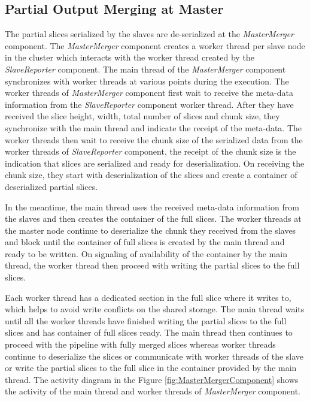 \subsection{Partial Output Merging at Master} \label{MMComp}

The partial slices serialized by the slaves are de-serialized at the \textit{MasterMerger} component. The \textit{MasterMerger} component creates a worker thread per slave node in the cluster which interacts with the worker thread created by the \textit{SlaveReporter} component. The main thread of the \textit{MasterMerger} component synchronizes with worker threads at various points during the execution. The worker threads of \textit{MasterMerger} component first wait to receive the meta-data information from the \textit{SlaveReporter} component worker thread. After they have received the slice height, width, total number of slices and chunk size, they synchronize with the main thread and indicate the receipt of the meta-data. The worker threads then wait to receive the chunk size of the serialized data from the worker threads of \textit{SlaveReporter} component, the receipt of the chunk size is the indication that slices are serialized and ready for deserialization. On receiving the chunk size, they start with deserialization of the slices and create a container of deserialized partial slices. \newline

In the meantime, the main thread uses the received meta-data information from the slaves and then creates the container of the full slices. The worker threads at the master node continue to deserialize the chunk they received from the slaves and block until the container of full slices is created by the main thread and ready to be written. On signaling of availability of the container by the main thread, the worker thread then proceed with writing the partial slices to the full slices.\newline 

Each worker thread has a dedicated section in the full slice where it writes to, which helps to avoid write conflicts on the shared storage. The main thread waits until all the worker threads have finished writing the partial slices to the full slices and has container of full slices ready. The main thread then continues to proceed with the pipeline with fully merged slices whereas worker threads continue to deserialize the slices or communicate with worker threads of the slave or write the partial slices to the full slice in the container provided by the main thread. The activity diagram in the Figure \ref{fig:MasterMergerComponent} shows the activity of the main thread and worker threads of \textit{MasterMerger} component. \newline
   
